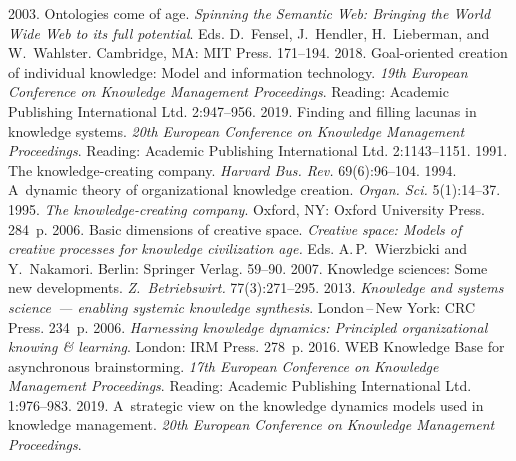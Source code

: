 {\begin{multicols}{2}
{\small\frenchspacing
 {%
 \begin{thebibliography}{99}
     2003. Ontologies come of age. \textit{Spinning the 
Semantic Web: Bringing the World Wide Web to its full potential}. Eds. D.~Fensel, 
J.~Hendler, H.~Lieberman, and W.~Wahlster. Cambridge, MA: MIT Press.  
171--194.
     2018. Goal-oriented creation of individual knowledge: Model 
and information technology. \textit{19th European Conference on Knowledge 
Management Proceedings}. Reading: Academic Publishing International Ltd.  
2:947--956.
     2019. Finding and filling lacunas in knowledge systems. 
\textit{20th European Conference on Knowledge Management Proceedings}. 
Reading: Academic Publishing International Ltd. 2:1143--1151.
     1991. The knowledge-creating company. \textit{Harvard 
Bus. Rev.} 69(6):96--104.
     1994. A~dynamic theory of organizational knowledge 
creation. \textit{Organ. Sci.} 5(1):14--37.
     1995. \textit{The knowledge-creating 
company}. Oxford, NY: Oxford University Press. 284~p.
     2006. Basic dimensions of creative 
space. \textit{Creative space: Models of creative processes for knowledge civilization 
age.} Eds. A.\,P.~Wierzbicki and Y.~Nakamori. Berlin: Springer Verlag. 59--90.
     2007. Knowledge sciences: Some 
new developments. \textit{Z.~Betriebswirt.} 77(3):271--295.
     2013. \textit{Knowledge and systems science~--- enabling 
systemic knowledge synthesis}. London\,--\,New York: CRC Press. 234~p.
     2006. \textit{Harnessing knowledge dynamics: Principled 
organizational knowing \& learning}. London: IRM Press. 278~p.
     2016. 
WEB Knowledge Base for asynchronous brainstorming. \textit{17th European 
Conference on Knowledge Management Proceedings}. Reading: Academic 
Publishing International Ltd. 1:976--983.
     2019. A~strategic view on the knowledge dynamics models 
used in knowledge management. 
    \textit{20th European Conference on Knowledge Management Proceedings}. 

\end{thebibliography}}}
\end{multicols}}
